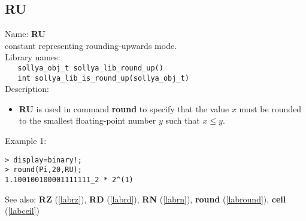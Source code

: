 \subsection{RU}
\label{labru}
\noindent Name: \textbf{RU}\\
\phantom{aaa}constant representing rounding-upwards mode.\\[0.2cm]
\noindent Library names:\\
\verb|   sollya_obj_t sollya_lib_round_up()|\\
\verb|   int sollya_lib_is_round_up(sollya_obj_t)|\\[0.2cm]
\noindent Description: \begin{itemize}

\item \textbf{RU} is used in command \textbf{round} to specify that the value $x$ must be rounded
   to the smallest floating-point number $y$ such that $x \le y$.
\end{itemize}
\noindent Example 1: 
\begin{center}\begin{minipage}{15cm}\begin{Verbatim}[frame=single]
> display=binary!;
> round(Pi,20,RU);
1.100100100001111111_2 * 2^(1)
\end{Verbatim}
\end{minipage}\end{center}
See also: \textbf{RZ} (\ref{labrz}), \textbf{RD} (\ref{labrd}), \textbf{RN} (\ref{labrn}), \textbf{round} (\ref{labround}), \textbf{ceil} (\ref{labceil})
